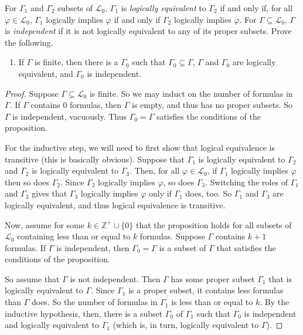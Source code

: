 \documentclass[12pt]{article}
\newenvironment{exercise}[2][Exercise]{\begin{trivlist}
\item[\hskip \labelsep {\bfseries #1}\hskip \labelsep {\bfseries #2.}]}{\end{trivlist}}
\begin{document}
\begin{exercise}{4}

For $\Gamma_1$ and $\Gamma_2$ subsets of $\mathcal{L}_0$, $\Gamma_1$ is \emph{logically equivalent} to $\Gamma_2$ if and only if, for all $\varphi \in \mathcal{L}_0$, $\Gamma_1$ logically implies $\varphi$ if and only if $\Gamma_2$ logically implies $\varphi$.  For $\Gamma \subseteq \mathcal{L}_0$, $\Gamma$ is \emph{independent} if it is not logically equivalent to any of its proper subsets.  Prove the following.

\begin{enumerate}[label = \alph*)]

\item If $\Gamma$ is finite, then there is a $\Gamma_0$ such that $\Gamma_0 \subseteq \Gamma$, $\Gamma$ and $\Gamma_0$ are logically equivalent, and $\Gamma_0$ is independent.

\end{enumerate}

\begin{proof}
Suppose $\Gamma \subseteq \mathcal{L}_0$ is finite.  So we may induct on the number of formulas in $\Gamma$.  If $\Gamma$ contains $0$ formulas, then $\Gamma$ is empty, and thus has no proper subsets.  So $\Gamma$ is independent, vacuously.  Thus $\Gamma_0 = \Gamma$ satisfies the conditions of the proposition.

For the inductive step, we will need to first show that logical equivalence is transitive (this is basically obvious).  Suppose that $\Gamma_1$ is logically equivalent to $\Gamma_2$ and $\Gamma_2$ is logically equivalent to $\Gamma_3$.  Then, for all $\varphi \in \mathcal{L}_0$, if $\Gamma_1$ logically implies $\varphi$ then so does $\Gamma_2$.  Since $\Gamma_2$ logically implies $\varphi$, so does $\Gamma_3$.    Switching the roles of $\Gamma_1$ and $\Gamma_3$ gives that $\Gamma_3$ logically implies $\varphi$ only if $\Gamma_1$ does, too.  So $\Gamma_1$ and $\Gamma_3$ are logically equivalent, and thus logical equivalence is transitive.

Now, assume for some $k \in \mathbb{Z}^+ \cup \{ 0 \}$ that the proposition holds for all subsets of $\mathcal{L}_0$ containing less than or equal to $k$ formulas.  Suppose $\Gamma$ contains $k+1$ formulas.  If $\Gamma$ is independent, then $\Gamma_0 = \Gamma$ is a subset of $\Gamma$ that satisfies the conditions of the proposition.

So assume that $\Gamma$ is not independent.  Then $\Gamma$ has some proper subset $\Gamma_1$ that is logically equivalent to $\Gamma$.  Since $\Gamma_1$ is a proper subset, it contains less formulas than $\Gamma$ does.  So the number of formulas in $\Gamma_1$ is less than or equal to $k$.  By the inductive hypothesis, then, there is a subset $\Gamma_0$ of $\Gamma_1$ such that $\Gamma_0$ is independent and logically equivalent to $\Gamma_1$ (which is, in turn, logically equivalent to $\Gamma$).


\end{proof}
\end{exercise}
\end{document}
